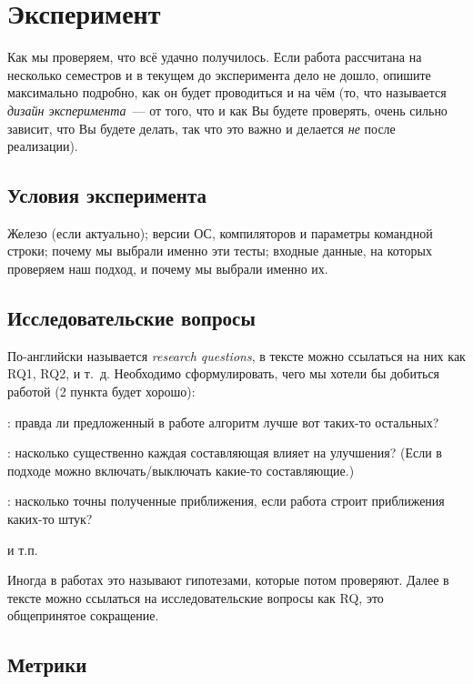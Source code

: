 
\section{Эксперимент}
Как мы проверяем, что всё удачно получилось.
Если работа рассчитана на несколько семестров и в текущем до эксперимента дело не дошло, опишите максимально подробно, как он будет прово\-диться и на чём
(то, что называется \emph{дизайн эксперимента}~--- от того, что и как Вы будете проверять, очень сильно зависит, что Вы будете делать, так что это важно и делается \emph{не} после реализации).

\subsection{Условия эксперимента}
Железо (если актуально);
версии ОС, компиляторов и параметры командной строки;
почему мы выбрали именно эти тесты; входные дан\-ные, на которых проверяем наш подход, и почему мы выбрали именно их.

\subsection{Исследовательские вопросы }
По-английски называется \emph{research questions}, в тексте можно ссылаться на них как RQ1, RQ2, и т.~д.
Необходимо сформулировать, чего мы хотели бы добиться работой (2 пункта будет хорошо):

\begin{description}
    \item[RQ1]: правда ли предложенный в работе алгоритм лучше вот таких-то остальных?
    \item[RQ2]: насколько существенно каждая составляющая влияет на улучшения?
    (Если в подходе можно включать/выключать какие-то составляющие.)
    \item[RQ3]: насколько точны полученные приближения, если работа строит приближения каких-то штук?
    \item и т.п.
\end{description}

Иногда в работах это называют гипотезами, которые потом проверяют.
Далее в тексте можно ссылаться на исследовательские вопросы как \textsc{RQ}, это обще\-при\-нятое сокращение.

\subsection{Метрики}

